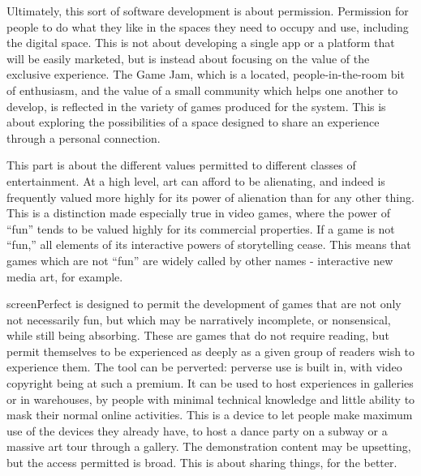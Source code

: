 Ultimately, this sort of software development is about permission. Permission for people to do what they like in the spaces they need to occupy and use, including the digital space. This is not about developing a single app or a platform that will be easily marketed, but is instead about focusing on the value of the exclusive experience. The Game Jam, which is a located, people-in-the-room bit of enthusiasm, and the value of a small community which helps one another to develop, is reflected in the variety of games produced for the system. This is about exploring the possibilities of a space designed to share an experience through a personal connection.

This part is about the different values permitted to different classes of entertainment. At  a high level, art can afford to be alienating, and indeed is frequently valued more highly for its power of alienation than for any other thing. This is a distinction made especially true in video games, where the power of “fun” tends to be valued highly for its commercial properties. If a game is not “fun,” all elements of its interactive powers of storytelling cease. This means that games which are not “fun” are widely called by other names - interactive new media art, for example. 

screenPerfect is designed to permit the development of games that are not only not necessarily fun, but which may be narratively incomplete, or nonsensical, while still being absorbing. These are games that do not require reading, but permit themselves to be experienced as deeply as a given group of readers wish to experience them. The tool can be perverted: perverse use is built in, with video copyright being at such a premium. It can be used to host experiences in galleries or in warehouses, by people with minimal technical knowledge and little ability to mask their normal online activities. This is a device to let people make maximum use of the devices they already have, to host a dance party on a subway or a massive art tour through a gallery. The demonstration content may be upsetting, but the access permitted is broad. This is about sharing things, for the better.
